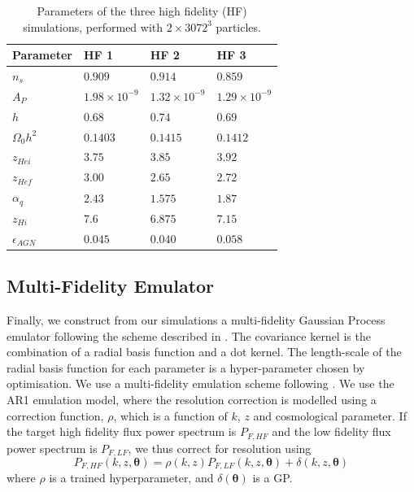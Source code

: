 \documentclass[a4paper,11pt]{article}
\begin{document}
\begin{table}
\begin{centering}
  \begin{tabular}{llll}
  \hline
  Parameter & HF 1 & HF 2 & HF 3\\
    \hline
    $n_s$  &  $0.909$  & $0.914$ & $0.859$ \\
    $A_P$  &  $1.98 \times 10^{-9}$  & $1.32 \times 10^{-9}$ & $1.29 \times 10^{-9}$\\
    $h$    & $0.68$  & $0.74$ & $0.69$\\
    $\Omega_0 h^2$ & $0.1403$ & $0.1415$ & $0.1412$\\
    $z_{Hei}$      & $3.75$  & $3.85$  & $ 3.92$ \\
    $z_{Hef}$      & $3.00$  & $2.65$  & $2.72$\\
    $\alpha_q$     & $2.43$  & $1.575$ & $ 1.87$ \\
    $z_{Hi}$        & $7.6$ & $6.875$   & $7.15 $\\
    $\epsilon_{AGN}$ & $0.045$ & $0.040$ & $ 0.058$\\
    \hline
  \end{tabular}
  \caption{Parameters of the three high fidelity (HF) simulations, performed with $2\times 3072^3$ particles.}
  \label{tab:highfidelity}
  \end{centering}
\end{table}

\subsection{Multi-Fidelity Emulator}

Finally, we construct from our simulations a multi-fidelity Gaussian Process emulator following the scheme described in \cite{Bird:2019, Fernandez:2022}. The covariance kernel is the combination of a radial basis function and a dot kernel. The length-scale of the radial basis function for each parameter is a hyper-parameter chosen by optimisation.
We use a multi-fidelity emulation scheme following \cite{Fernandez:2022}. We use the AR1 emulation model, where the resolution correction is modelled using a correction function, $\rho$, which is a function of $k$, $z$ and cosmological parameter. If the target high fidelity flux power spectrum is $P_{F, HF}$ and the low fidelity flux power spectrum is  $P_{F, LF}$, we thus correct for resolution using
\begin{equation}
 P_{F, HF}(k, z, \boldsymbol{\theta}) =  \rho(k, z) P_{F, LF}(k,z,\boldsymbol{\theta}) + \delta(k, z, \boldsymbol{\theta})
    \label{eq:mf_model}
\end{equation}
where $\rho$ is a trained hyperparameter, and $\delta(\boldsymbol{\theta})$ is a GP.
\end{document}
